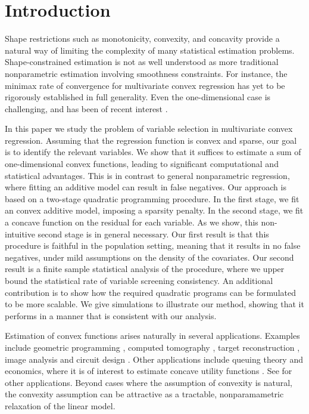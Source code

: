 \section{Introduction}


Shape restrictions such as monotonicity, convexity, and concavity
provide a natural way of limiting the complexity of many statistical
estimation problems.  Shape-constrained estimation is not as well
understood as more traditional nonparametric estimation involving
smoothness constraints.  For instance, the minimax rate of convergence
for multivariate convex regression has yet to be rigorously
established in full generality.  Even the one-dimensional case is
challenging, and has been of recent interest \citep{guntusen:13}.

In this paper we study the problem of variable selection in
multivariate convex regression.  Assuming that the regression function
is convex and sparse, our goal is to identify the relevant variables.
We show that it suffices to estimate a sum of one-dimensional convex
functions, leading to significant computational and statistical
advantages.  This is in contrast to general nonparametric regression,
where fitting an additive model can result in false negatives.  Our
approach is based on a two-stage quadratic programming procedure.  In
the first stage, we fit an convex additive model, imposing a sparsity
penalty.  In the second stage, we fit a concave function on the
residual for each variable.  As we show, this non-intuitive second
stage is in general necessary.  Our first result is that this
procedure is faithful in the population setting, meaning that it
results in no false negatives, under mild assumptions on the density
of the covariates.  Our second result is a finite sample statistical
analysis of the procedure, where we upper bound the statistical rate
of variable screening consistency.  An additional contribution is to show how the
required quadratic programs can be formulated to be more scalable.  We
give simulations to illustrate our method, showing that it performs in
a manner that is consistent with our analysis.

Estimation of convex functions arises naturally in several
applications.  Examples include geometric programming \citep{Boyd04},
computed tomography \citep{Prince:90}, target reconstruction
\citep{Lele:92}, image analysis \citep{Golden:06} and circuit design
\citep{Hannah:12}.  Other applications include queuing theory
\citep{Chen:01} and economics, where it is of interest to estimate
concave utility functions \citep{Pratt:68}.  See \cite{Lim:12} for
other applications.  
Beyond cases where the assumption of convexity is
natural, the convexity assumption can be attractive as a
tractable, nonparamametric relaxation of the linear model.  

